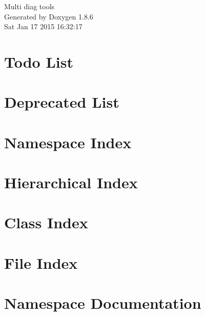\documentclass[twoside]{book}
\newcommand{\clearemptydoublepage}{%
  \newpage{\pagestyle{empty}\cleardoublepage}%
}
\begin{document}
\hypersetup{pageanchor=false}
\begin{titlepage}
\vspace*{7cm}
\begin{center}%
{\Large Multi diag tools }\\
\vspace*{1cm}
{\large Generated by Doxygen 1.8.6}\\
\vspace*{0.5cm}
{\small Sat Jan 17 2015 16:32:17}\\
\end{center}
\end{titlepage}
\clearemptydoublepage
\tableofcontents
\clearemptydoublepage
{}
\hypersetup{pageanchor=true}

\chapter{Todo List}
\label{todo}
\hypertarget{todo}{}

\chapter{Deprecated List}
\label{deprecated}
\hypertarget{deprecated}{}

\chapter{Namespace Index}

\chapter{Hierarchical Index}

\chapter{Class Index}

\chapter{File Index}

\chapter{Namespace Documentation}






\end{document}
